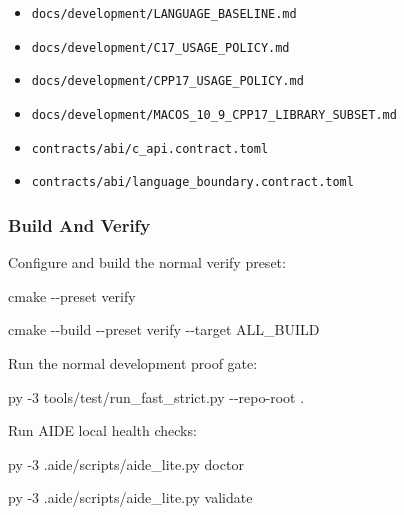 \documentclass[9pt,a4paper,openany]{book}
\newcommand{\vonecode}[1]{\par\smallskip\noindent\begingroup\setlength{\fboxsep}{7pt}\colorbox{DomCodeBg}{\parbox{0.94\linewidth}{\footnotesize\ttfamily #1}}\endgroup\par\smallskip}
\begin{document}
\begin{itemize}
\item \texttt{docs/\allowbreak{}development/\allowbreak{}LANGUAGE\_\allowbreak{}BASELINE.\allowbreak{}md}
\item \texttt{docs/\allowbreak{}development/\allowbreak{}C17\_\allowbreak{}USAGE\_\allowbreak{}POLICY.\allowbreak{}md}
\item \texttt{docs/\allowbreak{}development/\allowbreak{}CPP17\_\allowbreak{}USAGE\_\allowbreak{}POLICY.\allowbreak{}md}
\item \texttt{docs/\allowbreak{}development/\allowbreak{}MACOS\_\allowbreak{}10\_\allowbreak{}9\_\allowbreak{}CPP17\_\allowbreak{}LIBRARY\_\allowbreak{}SUBSET.\allowbreak{}md}
\item \texttt{contracts/\allowbreak{}abi/\allowbreak{}c\_\allowbreak{}api.\allowbreak{}contract.\allowbreak{}toml}
\item \texttt{contracts/\allowbreak{}abi/\allowbreak{}language\_\allowbreak{}boundary.\allowbreak{}contract.\allowbreak{}toml}
\end{itemize}

\subsubsection{Build And Verify}

Configure and build the normal verify preset:


\vonecode{cmake -\allowbreak{}-\allowbreak{}preset verify\par
cmake -\allowbreak{}-\allowbreak{}build -\allowbreak{}-\allowbreak{}preset verify -\allowbreak{}-\allowbreak{}target ALL\_\allowbreak{}BUILD\par}

Run the normal development proof gate:


\vonecode{py -\allowbreak{}3 tools/\allowbreak{}test/\allowbreak{}run\_\allowbreak{}fast\_\allowbreak{}strict.\allowbreak{}py -\allowbreak{}-\allowbreak{}repo-\allowbreak{}root .\allowbreak{}\par}

Run AIDE local health checks:


\vonecode{py -\allowbreak{}3 .\allowbreak{}aide/\allowbreak{}scripts/\allowbreak{}aide\_\allowbreak{}lite.\allowbreak{}py doctor\par
py -\allowbreak{}3 .\allowbreak{}aide/\allowbreak{}scripts/\allowbreak{}aide\_\allowbreak{}lite.\allowbreak{}py validate\par}
\end{document}
